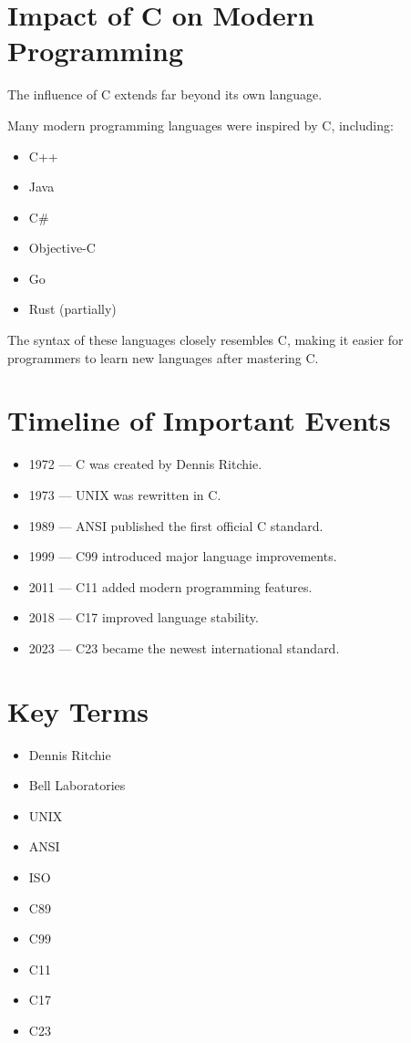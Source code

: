 \documentclass[12pt,openany]{book}
\begin{document}
\section{Impact of C on Modern Programming}

The influence of C extends far beyond its own language.

Many modern programming languages were inspired by C, including:

\begin{itemize}
    \item C++
    \item Java
    \item C\#
    \item Objective-C
    \item Go
    \item Rust (partially)
\end{itemize}

The syntax of these languages closely resembles C, making it easier for programmers to learn new languages after mastering C.

\section{Timeline of Important Events}

\begin{itemize}
    \item 1972 --- C was created by Dennis Ritchie.
    \item 1973 --- UNIX was rewritten in C.
    \item 1989 --- ANSI published the first official C standard.
    \item 1999 --- C99 introduced major language improvements.
    \item 2011 --- C11 added modern programming features.
    \item 2018 --- C17 improved language stability.
    \item 2023 --- C23 became the newest international standard.
\end{itemize}

\section{Key Terms}

\begin{itemize}
    \item Dennis Ritchie
    \item Bell Laboratories
    \item UNIX
    \item ANSI
    \item ISO
    \item C89
    \item C99
    \item C11
    \item C17
    \item C23
\end{itemize}
\end{document}
